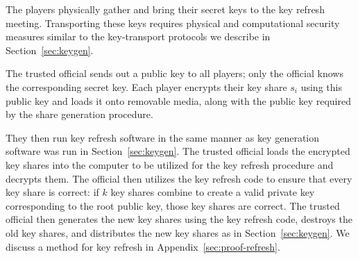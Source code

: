 The players physically gather and bring their secret keys
 to the key
refresh meeting. Transporting these keys requires physical
 and
computational security measures similar to the key-transport
protocols we describe in Section~\ref{sec:keygen}.

The trusted official sends out a public key to all players; only the
official knows the corresponding secret key. Each player encrypts
their key share $s_i$ using this public key and loads it onto
removable media, along with the public key required by the share
generation procedure.
 
 They then run key refresh software in the
same
 manner as key generation software was run in
Section~\ref{sec:keygen}. The trusted official loads the encrypted key
shares into the computer to be utilized for the key refresh procedure
and decrypts them. The official then utilizes the key refresh code to
ensure that every key share is correct: if $k$ key shares combine to
create a valid private key corresponding to the root public key, those
key shares are correct. The trusted official then generates the new
key shares using the key refresh code, destroys the old key shares,
and distributes the new key shares as in Section~\ref{sec:keygen}.  We
discuss a method for key refresh in Appendix~\ref{sec:proof-refresh}.






